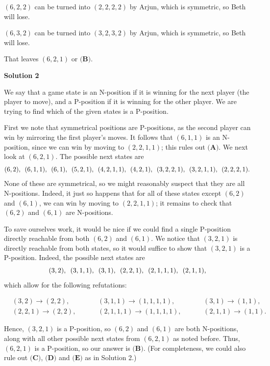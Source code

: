 \begin{enumerate}
 $(6,2,2)$ can be turned into $(2,2,2,2)$ by Arjun, which is symmetric, so Beth will lose.

 $(6,3,2)$ can be turned into $(3,2,3,2)$ by Arjun, which is symmetric, so Beth will lose.

 That leaves $(6,2,1)$ or $\boxed{\textbf{(B)}}$.

 



\textbf{Solution 2}

We say that a game state is an N-position if it is winning for the next player (the player to move), and a P-position if it is winning for the other player. We are trying to find which of the given states is a P-position.

 First we note that symmetrical positions are P-positions, as the second player can win by mirroring the first player's moves. It follows that $(6, 1, 1)$ is an N-position, since we can win by moving to $(2, 2, 1, 1)$; this rules out $\textbf{(A)}$. We next look at $(6, 2, 1)$. The possible next states are
 \[(6, 2), \enskip (6, 1, 1), \enskip (6, 1), \enskip (5, 2, 1), \enskip (4, 2, 1, 1), \enskip (4, 2, 1), \enskip (3, 2, 2, 1), \enskip (3, 2, 1, 1), \enskip (2, 2, 2, 1).\]None of these are symmetrical, so we might reasonably suspect that they are all N-positions. Indeed, it just so happens that for all of these states except $(6, 2)$ and $(6, 1)$, we can win by moving to $(2, 2, 1, 1)$; it remains to check that $(6, 2)$ and $(6, 1)$ are N-positions.

 To save ourselves work, it would be nice if we could find a single P-position directly reachable from both $(6, 2)$ and $(6, 1)$. We notice that $(3, 2, 1)$ is directly reachable from both states, so it would suffice to show that $(3, 2, 1)$ is a P-position. Indeed, the possible next states are
 \[(3, 2), \enskip (3, 1, 1), \enskip (3, 1), \enskip (2, 2, 1), \enskip (2, 1, 1, 1), \enskip (2, 1, 1),\]which allow for the following refutations:

 
 \begin{align*} &(3, 2) \to (2, 2), && &&(3, 1, 1) \to (1, 1, 1, 1), && &&(3, 1) \to (1, 1), \\ &(2, 2, 1) \to (2, 2), && &&(2, 1, 1, 1) \to (1, 1, 1, 1), && &&(2, 1, 1) \to (1, 1). \end{align*}


 Hence, $(3, 2, 1)$ is a P-position, so $(6, 2)$ and $(6, 1)$ are both N-positions, along with all other possible next states from $(6, 2, 1)$ as noted before. Thus, $(6, 2, 1)$ is a P-position, so our answer is $\boxed{\textbf{(B)}}$. (For completeness, we could also rule out $\textbf{(C)}$, $\textbf{(D)}$ and $\textbf{(E)}$ as in Solution 2.)


\end{enumerate}
